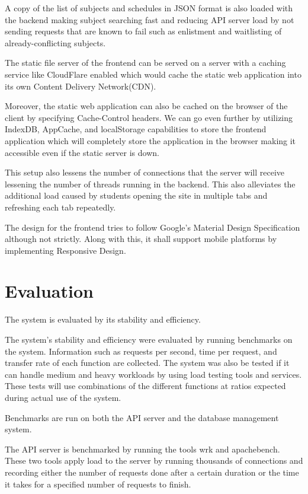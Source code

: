 \documentclass[draft]{sigchi}
\begin{document}
A copy of the list of subjects and schedules in JSON format is also loaded with the backend
making subject searching fast and reducing API server load by not sending requests that are known 
to fail such as enlistment and waitlisting of already-conflicting subjects.

The static file server of the frontend can be served on a server with a caching service
like CloudFlare enabled which would cache the static web application into its own 
Content Delivery Network(CDN).

Moreover, the static web application can also be cached on the browser of the client by
specifying Cache-Control headers. We can go even further by utilizing IndexDB, AppCache,
and localStorage capabilities to store the frontend application which will completely store
the application in the browser making it accessible even if the static server is down.

This setup also lessens the number of connections that the server will receive lessening
the number of threads running in the backend. This also alleviates the additional load 
caused by students opening the site in multiple tabs and refreshing each tab repeatedly.

The design for the frontend tries to follow Google's Material Design 
Specification although not strictly. Along with this, it shall support mobile
platforms by implementing Responsive Design. 

\section{Evaluation}

The system is evaluated by its stability and efficiency.

The system's stability and efficiency were evaluated by running benchmarks on the system.
Information such as requests per second, time per request, and transfer rate
of each function are collected. The system was also be tested if it can 
handle medium and heavy workloads by using load testing tools and services.
These tests will use combinations of the different functions at ratios expected
during actual use of the system. 

Benchmarks are run on both the API server and the database management system.

The API server is benchmarked by running the tools wrk and apachebench. These two tools apply 
load to the server by running thousands of connections and recording either the number
of requests done after a certain duration or the time it takes for a specified number of requests to finish.
\end{document}
